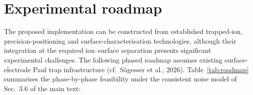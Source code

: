 \documentclass[12pt,a4paper]{article}
\begin{document}
\section{Experimental roadmap}

The proposed implementation can be constructed from established
trapped-ion, precision-positioning and surface-characterisation
technologies, although their integration at the required ion--surface
separation presents significant experimental challenges.  The following
phased roadmap assumes existing surface-electrode Paul trap
infrastructure (cf.\ S{\"a}gesser et al., 2026).
Table~\ref{tab:roadmap} summarises the phase-by-phase feasibility under
the consistent noise model of Sec.~3.6 of the main text:
\end{document}
